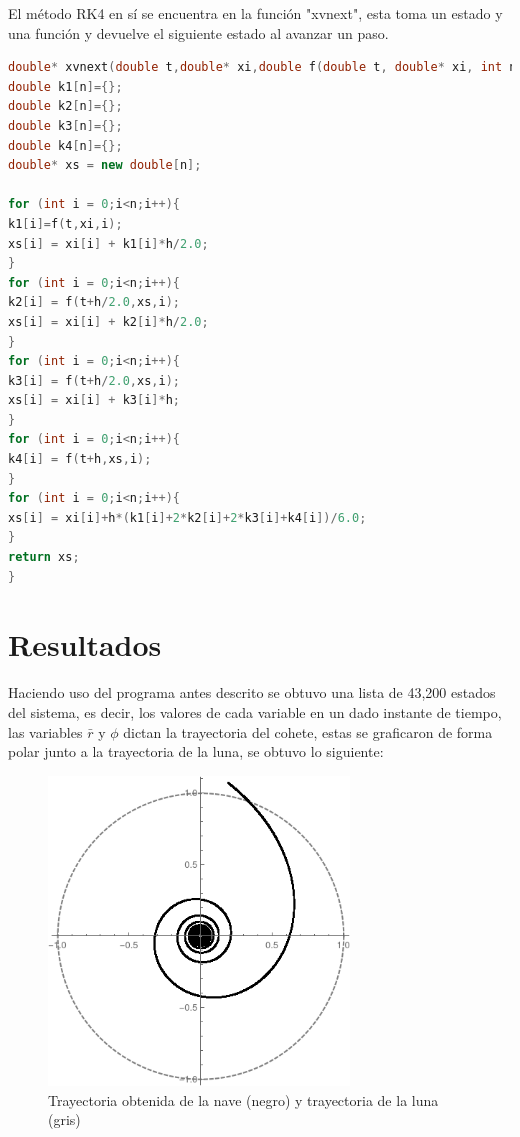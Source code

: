\documentclass{article}
\begin{document}
El método RK4 en sí se encuentra en la función "xvnext", esta toma un estado y una función y devuelve el siguiente estado al avanzar un paso.

\begin{lstlisting}[language=C++,caption=Método RK4 para sistemas de ecuaciones diferenciales]
double* xvnext(double t,double* xi,double f(double t, double* xi, int n),double h, const int n){
double k1[n]={};
double k2[n]={};
double k3[n]={};
double k4[n]={};
double* xs = new double[n];

for (int i = 0;i<n;i++){
k1[i]=f(t,xi,i);
xs[i] = xi[i] + k1[i]*h/2.0;
}
for (int i = 0;i<n;i++){
k2[i] = f(t+h/2.0,xs,i);
xs[i] = xi[i] + k2[i]*h/2.0;
}
for (int i = 0;i<n;i++){
k3[i] = f(t+h/2.0,xs,i);
xs[i] = xi[i] + k3[i]*h;
}
for (int i = 0;i<n;i++){
k4[i] = f(t+h,xs,i);
}
for (int i = 0;i<n;i++){
xs[i] = xi[i]+h*(k1[i]+2*k2[i]+2*k3[i]+k4[i])/6.0;
}
return xs;
}
\end{lstlisting}

\section{Resultados}

Haciendo uso del programa antes descrito se obtuvo una lista de 43,200 estados del sistema, es decir, los valores de cada variable en un dado instante de tiempo, las variables $\bar{r}$ y $\phi$ dictan la trayectoria del cohete, estas se graficaron de forma polar junto a la trayectoria de la luna, se obtuvo lo siguiente:

\begin{figure}[H]
	\centering
	\includegraphics[width=8cm]{Trayectoria}
	\caption{Trayectoria obtenida de la nave (negro) y trayectoria de la luna (gris)}
\end{figure}
\end{document}
